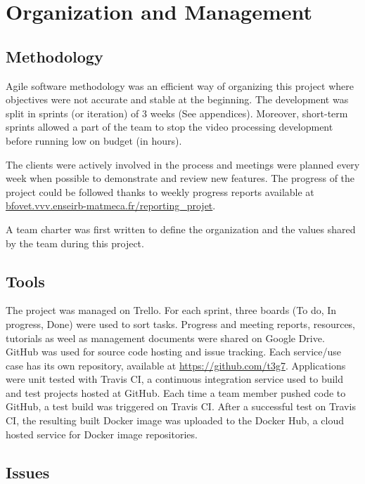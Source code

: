 \documentclass[11pt]{article}
\begin{document}
%
%

\section{Organization and Management}

\subsection{Methodology}

Agile software methodology was an efficient way of organizing this project where objectives were not accurate and stable at the beginning. The development was split in sprints (or iteration) of 3 weeks (See appendices).
Moreover, short-term sprints allowed a part of the team to stop the video processing development before running low on budget (in hours).

The clients were actively involved in the process and meetings were planned every week when possible to demonstrate and review new features. The progress of the project could be followed thanks to weekly progress reports available at \url{bfovet.vvv.enseirb-matmeca.fr/reporting_projet}.

A team charter was first written to define the organization and the values shared by the team during this project.

\subsection{Tools}

The project was managed on \textsf{Trello}. For each sprint, three boards (To do, In progress, Done) were used to sort tasks.
Progress and meeting reports, resources, tutorials as weel as management documents were shared on \textsf{Google Drive}.
\textsf{GitHub} was used for source code hosting and issue tracking. Each service/use case has its own repository, available at \url{https://github.com/t3g7}.
Applications were unit tested with \textsf{Travis CI}, a continuous integration service used to build and test projects hosted at \textsf{GitHub}. Each time a team member pushed code to \textsf{GitHub}, a test build was triggered on \textsf{Travis CI}.
After a successful test on \textsf{Travis CI}, the resulting built \textsf{Docker} image was uploaded to the \textsf{Docker Hub}, a cloud hosted service for \textsf{Docker} image repositories.

\subsection{Issues}
\end{document}
